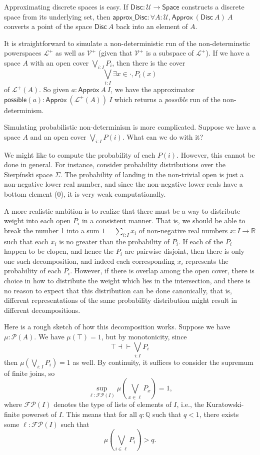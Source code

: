 \documentclass{article}           %
\newcommand{\R}{\mathbb{R}}
\newcommand{\rat}{\mathbb{Q}}
\newcommand{\Type}{\mathcal{U}}
\newcommand{\Space}{\mathsf{Space}}
\newcommand{\Prob}{\mathcal{P}}
\newcommand{\PLower}{\mathcal{L}^+}
\newcommand{\Viet}{{\mathcal{V}^+}}
\begin{document}
Approximating discrete spaces is easy. If $\mathsf{Disc} : \Type \to \Space$ constructs a discrete space from its underlying set, then $\mathsf{approx\_Disc} : \forall A : \Type, \mathsf{Approx}\ (\mathsf{Disc}\ A)\ A$ converts a point of the space $\mathsf{Disc}\ A$ back into an element of $A$.

It is straightforward to simulate a non-deterministic run of the non-determinstic powerspaces $\PLower$ as well as $\Viet$ (given that $\Viet$ is a subspace of $\PLower$). If we have a space $A$ with an open cover $\bigvee_{i : I} P_i$, then there is the cover
\[
\bigvee_{i : I} \exists x \in \cdot, P_i(x)
\]
of $\PLower(A)$. So given $a : \mathsf{Approx}\ A\ I$, we have the approximator $\mathsf{possible}(a) : \mathsf{Approx}\ (\PLower(A))\ I$ which returns a \emph{possible} run of the non-determinism.

Simulating probabilistic non-determinism is more complicated. Suppose we have a space $A$ and an open cover $\bigvee_{i : I} P(i)$. What can we do with it?

We might like to compute the probability of each $P(i)$. However, this cannot be done in general. For instance, consider probability distributions over the Sierpínski space $\Sigma$. The probability of landing in the non-trivial open is just a non-negative lower real number, and since the non-negative lower reals have a bottom element (0), it is very weak computationally.

A more realistic ambition is to realize that there must be a way to distribute weight into each open $P_i$ in a consistent manner. That is, we should be able to break the number 1 into a sum $1 = \sum_{i : I} x_i$ of non-negative real numbers $x : I \to \R$ such that each $x_i$ is no greater than the probability of $P_i$. If each of the $P_i$ happen to be clopen, and hence the $P_i$ are pairwise disjoint, then there is only one such decomposition, and indeed each corresponding $x_i$ represents the probability of each $P_i$. However, if there is overlap among the open cover, there is choice in how to distribute the weight which lies in the intersection, and there is no reason to expect that this distribution can be done canonically, that is, different representations of the same probability distribution might result in different decompositions.

Here is a rough sketch of how this decomposition works. Suppose we have $\mu : \Prob(A)$. We have $\mu(\top) = 1$, but by monotonicity, since
\[
\top \dashv \vdash \bigvee_{i : I} P_i
\]
then $\mu\left( \bigvee_{i : I} P_i \right) = 1$ as well. By continuity, it suffices to consider the supremum of finite joins, so
\[
\sup_{\ell : \mathcal{FP}(I)} \mu \left( \bigvee_{x \in \ell} P_x \right) = 1,
\]
where $\mathcal{FP}(I)$ denotes the type of lists of elements of $I$, i.e., the Kuratowski-finite powerset of $I$. This means that for all $q : \rat$ such that $q < 1$, there exists some $\ell : \mathcal{FP}(I)$ such that
\[
\mu \left( \bigvee_{i \in \ell} P_i \right) > q.
\]
\end{document}
